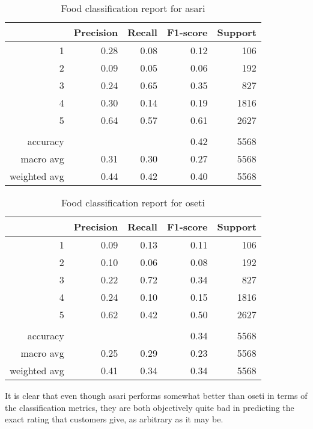 \documentclass[12pt]{article}
\begin{document}
	\begin{table}
		\begin{center}
			{\renewcommand{\arraystretch}{1.5}
				\renewcommand{\tabcolsep}{0.2cm}
				\begin{tabular}{r r r r r}
					& Precision & Recall & F1-score & Support\\
					\hline
					1 & 0.28 & 0.08 & 0.12 & 106\\
					2 & 0.09 & 0.05 & 0.06 & 192\\
					3 & 0.24 & 0.65 & 0.35 & 827\\
					4 & 0.30 & 0.14 & 0.19 & 1816\\
					5 & 0.64 & 0.57 & 0.61 & 2627\\
					& & & & \\
					accuracy & & & 0.42 & 5568\\
					macro avg & 0.31 & 0.30 & 0.27 & 5568\\
					weighted avg & 0.44 & 0.42 & 0.40 & 5568
			\end{tabular}}
		\end{center}
		\caption{Food classification report for asari}
	\end{table}
	
	\begin{table}
		\begin{center}
			{\renewcommand{\arraystretch}{1.5}
				\renewcommand{\tabcolsep}{0.2cm}
				\begin{tabular}{r r r r r}
					& Precision & Recall & F1-score & Support\\
					\hline
					1 & 0.09 & 0.13 & 0.11 & 106\\
					2 & 0.10 & 0.06 & 0.08 & 192\\
					3 & 0.22 & 0.72 & 0.34 & 827\\
					4 & 0.24 & 0.10 & 0.15 & 1816\\
					5 & 0.62 & 0.42 & 0.50 & 2627\\
					& & & & \\
					accuracy & & & 0.34 & 5568\\
					macro avg & 0.25 & 0.29 & 0.23 & 5568\\
					weighted avg & 0.41 & 0.34 & 0.34 & 5568
			\end{tabular}}
		\end{center}
		\caption{Food classification report for oseti}
	\end{table}
	
	It is clear that even though asari performs somewhat better than oseti in terms of the classification metrics, they are both objectively quite bad in predicting the exact rating that customers give, as arbitrary as it may be.
	
\end{document}

